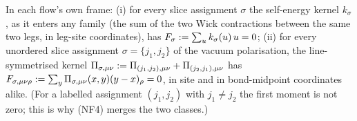 
\begin{lemma}\label{rot:h1s:M}
In each flow's own frame: \textup{(i)} for every slice assignment $\sigma$ the self-energy kernel $k_\sigma$, as it enters any family (the sum of the two Wick contractions between the same two legs, in leg-site coordinates), has $F_\sigma:=\sum_uk_\sigma(u)\,u=0$; \textup{(ii)} for every unordered slice assignment $\sigma=\{j_1,j_2\}$ of the vacuum polarisation, the line-symmetrised kernel $\Pi_{\sigma,\mu\nu}:=\Pi_{(j_1,j_2),\mu\nu}+\Pi_{(j_2,j_1),\mu\nu}$ has $F_{\sigma,\mu\nu\rho}:=\sum_y\Pi_{\sigma,\mu\nu}(x,y)(y-x)_\rho=0$, in site and in bond-midpoint coordinates alike. (For a labelled assignment $(j_1,j_2)$ with $j_1\ne j_2$ the first moment is not zero; this is why (NF4) merges the two classes.)
\end{lemma}
